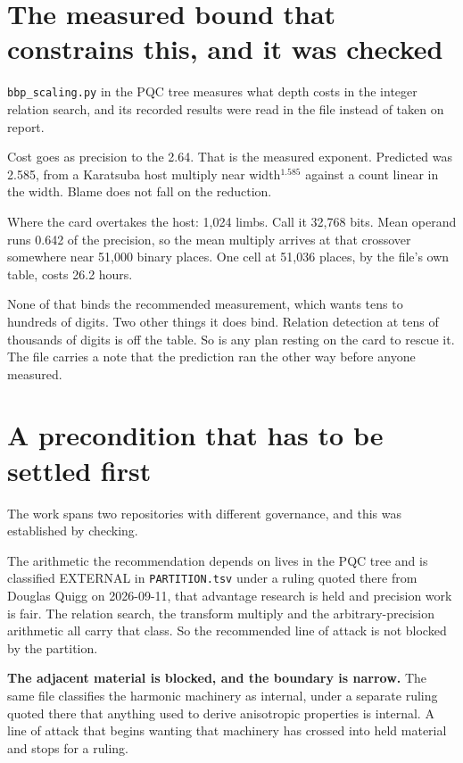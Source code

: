 \section{The measured bound that constrains this, and it was checked}

\texttt{bbp\_scaling.py} in the PQC tree measures what depth costs in the integer relation
search, and its recorded results were read in the file instead of taken on report.

Cost goes as precision to the 2.64. That is the measured exponent. Predicted was 2.585, from a
Karatsuba host multiply near width$^{1.585}$ against a count linear in the width. Blame does not
fall on the reduction.

Where the card overtakes the host: 1{,}024 limbs. Call it 32{,}768 bits. Mean operand runs 0.642 of
the precision, so the mean multiply arrives at that crossover somewhere near 51{,}000 binary places.
One cell at 51{,}036 places, by the file's own table, costs 26.2 hours.

None of that binds the recommended measurement, which wants tens to hundreds of digits. Two other
things it does bind. Relation detection at tens of thousands of digits is off the table. So is any
plan resting on the card to rescue it. The file carries a note that the prediction ran the other way
before anyone measured.

\section{A precondition that has to be settled first}

The work spans two repositories with different governance, and this was established by checking.

The arithmetic the recommendation depends on lives in the PQC tree and is classified EXTERNAL
in \texttt{PARTITION.\allowbreak{}tsv} under a ruling quoted there from Douglas Quigg on
2026-09-11, that advantage research is held and precision work is fair. The relation search, the
transform multiply and the arbitrary-precision arithmetic all carry that class. So the recommended
line of attack is not blocked by the partition.

\textbf{The adjacent material is blocked, and the boundary is narrow.} The same file classifies the
harmonic machinery as internal, under a separate ruling quoted there that anything used to derive
anisotropic properties is internal. A line of attack that begins wanting that machinery has crossed
into held material and stops for a ruling.

